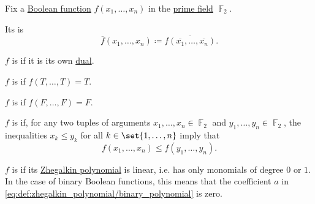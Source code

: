 \begin{definition}\label{def:boolean_functions_in_f2}
  Fix a \hyperref[def:boolean_function]{Boolean function} \( f(x_1, \ldots, x_n) \) in the \hyperref[thm:finite_fields]{prime field} \( \BbbF_2 \).

  \begin{thmenum}
     Its  is
    \begin{equation*}
      \overline{f}(x_1, \ldots, x_n) \coloneqq \overline{f(\overline{x_1}, \ldots, \overline{x_n})}.
    \end{equation*}

     \( f \) is  if it is its own \hyperref[def:boolean_function_in_f2/dual]{dual}.

     \( f \) is  if \( f(T, \ldots, T) = T \).

     \( f \) is  if \( f(F, \ldots, F) = F \).

     \( f \) is  if, for any two tuples of arguments \( x_1, \ldots, x_n \in \BbbF_2 \) and \( y_1, \ldots, y_n \in \BbbF_2 \), the inequalities \( x_k \leq y_k \) for all \( k \in \set{ 1, \ldots, n } \) imply that
    \begin{equation*}
      f(x_1, \ldots, x_n) \leq f(y_1, \ldots, y_n).
    \end{equation*}

     \( f \) is  if its \hyperref[def:zhegalkin_polynomial]{Zhegalkin polynomial} is linear, i.e. has only monomials of degree \( 0 \) or \( 1 \). In the case of binary Boolean functions, this means that the coefficient \( a \) in \eqref{eq:def:zhegalkin_polynomial/binary_polynomial} is zero.
  \end{thmenum}
\end{definition}

